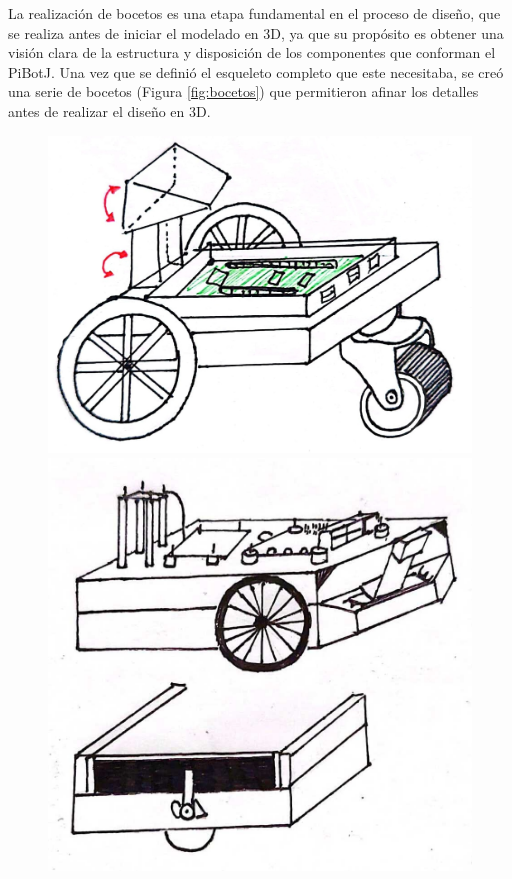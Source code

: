 La realización de bocetos es una etapa fundamental en el proceso de diseño, que se realiza antes de iniciar el modelado en 3D, ya que su propósito es obtener una visión clara de la estructura y disposición de los componentes que conforman el PiBotJ. Una vez que se definió el esqueleto completo que este necesitaba, se creó una serie de bocetos (Figura \ref{fig:bocetos}) que permitieron afinar los detalles antes de realizar el diseño en 3D.

\begin{figure}[ht!]
	\centering
	\begin{minipage}{0.4\linewidth}
		\centering
		\includegraphics[width=\linewidth]{figs/cap5/prototipo_sin_laser.jpeg}
	\end{minipage}
	\hspace{1cm}
	\begin{minipage}{0.5\linewidth}
		\centering
		\includegraphics[width=\linewidth]{figs/cap5/boceto_papel.jpeg}

\end{minipage}
\end{figure}
